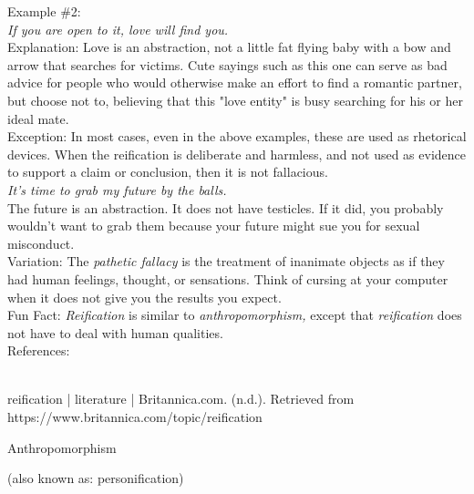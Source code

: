 \documentclass[a4paper,12pt,single,pdftex]{scrbook}
\begin{document}
    
      Example \#2:
    \\

    
      {\em If you are open to it, love will find you.}
    \\

    
      Explanation:  Love is an abstraction, not a little fat flying baby with a bow and arrow that searches for victims.  Cute sayings such as this one can serve as bad advice for people who would otherwise make an effort to find a romantic partner, but choose not to, believing that this "love entity" is busy searching for his or her ideal mate.
    \\

    
      Exception: In most cases, even in the above examples, these are used as rhetorical devices. When the reification is deliberate and harmless, and not used as evidence to support a claim or conclusion, then it is not fallacious.
    \\

    
      {\em It’s time to grab my future by the balls.}
    \\

    
      The future is an abstraction. It does not have testicles. If it did, you probably wouldn’t want to grab them because your future might sue you for sexual misconduct.
    \\

    
      Variation: The {\it pathetic fallacy} is the treatment of inanimate objects as if they had human feelings, thought, or sensations.  Think of cursing at your computer when it does not give you the results you expect.
    \\

    
      Fun Fact: {\em Reification} is similar to {\it anthropomorphism}{\em ,}  except that {\em reification} does not have to deal with human qualities.
    \\

    References:

    
      
        
      \\

      
        
          reification | literature | Britannica.com. (n.d.). Retrieved from https://www.britannica.com/topic/reification
        
      
    
  

Anthropomorphism
    
      (also known as: personification)
    \\
\end{document}
